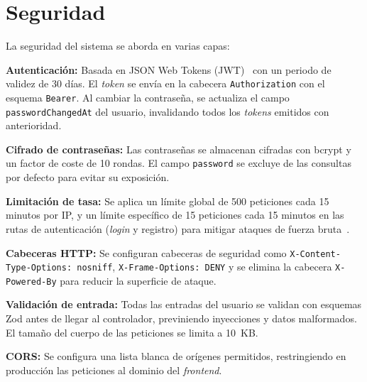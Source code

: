 \section{Seguridad}\label{sec:seguridad}

La seguridad del sistema se aborda en varias capas:

\textbf{Autenticaci\'on:} Basada en JSON Web Tokens (JWT)~\cite{jwt_rfc} con un periodo de validez de 30 d\'ias. El \textit{token} se env\'ia en la cabecera \texttt{Authorization} con el esquema \texttt{Bearer}. Al cambiar la contrase\~na, se actualiza el campo \texttt{passwordChangedAt} del usuario, invalidando todos los \textit{tokens} emitidos con anterioridad.

\textbf{Cifrado de contrase\~nas:} Las contrase\~nas se almacenan cifradas con bcrypt y un factor de coste de 10 rondas. El campo \texttt{password} se excluye de las consultas por defecto para evitar su exposici\'on.

\textbf{Limitaci\'on de tasa:} Se aplica un l\'imite global de 500 peticiones cada 15 minutos por IP, y un l\'imite espec\'ifico de 15 peticiones cada 15 minutos en las rutas de autenticaci\'on (\textit{login} y registro) para mitigar ataques de fuerza bruta~\cite{owasp_rate_limiting}.

\textbf{Cabeceras HTTP:} Se configuran cabeceras de seguridad como \texttt{X-Content-Type-Options: nosniff}, \texttt{X-Frame-Options: DENY} y se elimina la cabecera \texttt{X-Powered-By} para reducir la superficie de ataque.

\textbf{Validaci\'on de entrada:} Todas las entradas del usuario se validan con esquemas Zod antes de llegar al controlador, previniendo inyecciones y datos malformados. El tama\~no del cuerpo de las peticiones se limita a 10~KB.

\textbf{CORS:} Se configura una lista blanca de or\'igenes permitidos, restringiendo en producci\'on las peticiones al dominio del \textit{frontend}.

